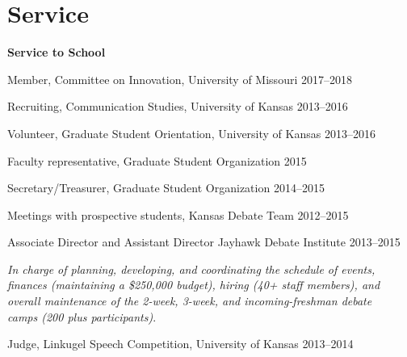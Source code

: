 \section{Service}

\textbf{Service to School}
  \begin{innerlist}
    \item Member, Committee on Innovation, University of Missouri \hfill 2017--2018
    \item Recruiting, Communication Studies, University of Kansas \hfill 2013--2016
    \item Volunteer, Graduate Student Orientation, University of Kansas \hfill 2013--2016
    \item Faculty representative, Graduate Student Organization \hfill 2015
    \item Secretary/Treasurer, Graduate Student Organization \hfill 2014--2015
    \item Meetings with prospective students, Kansas Debate Team \hfill 2012--2015
    \item Associate Director and Assistant Director Jayhawk Debate Institute \hfill 2013--2015
    \begin{outerlist}
      \item[]\textit{In charge of planning, developing, and coordinating the schedule of events,\\
        finances (maintaining a \$250,000 budget), hiring (40+ staff members), and\\
        overall maintenance of the 2-week, 3-week, and incoming-freshman debate \\
        camps (200 plus participants)}.
    \end{outerlist} \vspace{1em}
    \item Judge, Linkugel Speech Competition, University of Kansas \hfill 2013--2014
    \end{innerlist}\vspace{1em}

